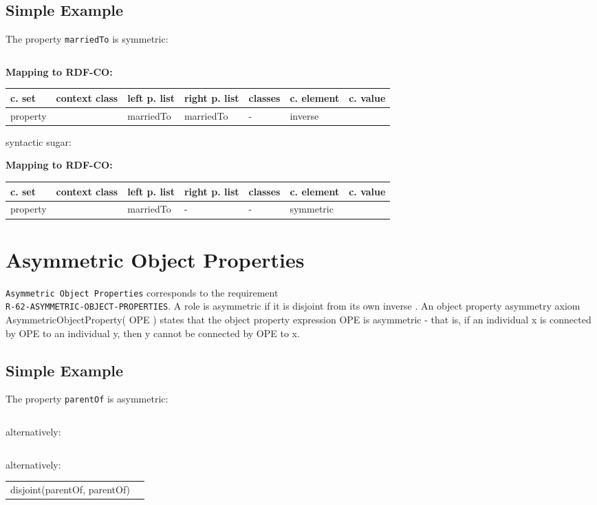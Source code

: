 \documentclass{llncs}
\newcommand{\ms}[1]{\texttt{#1}}
\newenvironment{gcotable}{
  \scriptsize
  \sffamily
  \vspace{0cm}
	\begin{center}
	\textbf{\vspace{0.4cm}Mapping to RDF-CO:} \\
  \begin{tabular}{l|l|l|l|l|l|l}
	\hline
  \textbf{c. set} & \textbf{context class} & \textbf{left p. list} & \textbf{right p. list} & \textbf{classes} & \textbf{c. element} & \textbf{c. value} \\
  \hline

}{
  \hline
  \end{tabular}
	\end{center}
}
\newenvironment{DL}{
\vspace{0cm}
	\begin{center}
  \begin{tabular}{r l}

}{
  \end{tabular}
	\end{center}
}
\begin{document}
\subsection{Simple Example}

The property \ms{marriedTo} is symmetric:

\begin{DL}
 \\
\end{DL}

\begin{gcotable}
property &  & marriedTo & marriedTo & - & inverse \\
\end{gcotable}

syntactic sugar:

\begin{gcotable}
property &  & marriedTo & - & - & symmetric \\
\end{gcotable}

\section{Asymmetric Object Properties}

\ms{Asymmetric Object Properties} corresponds to the requirement \\
\ms{R-62-ASYMMETRIC-OBJECT-PROPERTIES}.
A role is asymmetric if it is disjoint from its own inverse \cite{Kroetzsch2012}.
An object property asymmetry axiom AsymmetricObjectProperty( OPE ) states that the object property expression OPE is asymmetric - that is, if an individual x is connected by OPE to an individual y, then y cannot be connected by OPE to x. 

\subsection{Simple Example}

The property \ms{parentOf} is asymmetric:

\begin{DL}
 
\end{DL}

alternatively:

\begin{DL}
 
\end{DL}

alternatively:

\begin{DL}
disjoint(parentOf, parentOf)
\end{DL}
\end{document}
